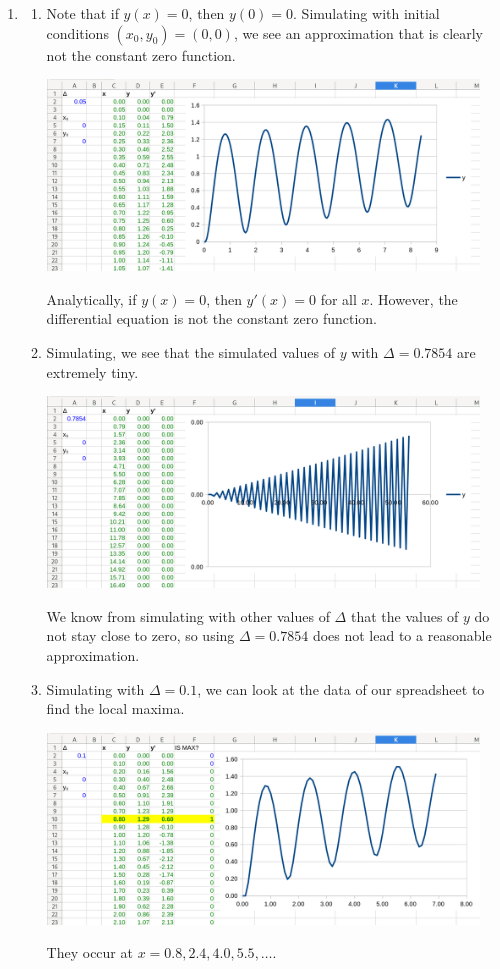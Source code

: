 		\begin{enumerate}
			\item \begin{enumerate}
					\item Note that if $y(x)=0$, then $y(0)=0$. Simulating with initial conditions $(x_0,y_0)=(0,0)$, we see
					an approximation that is clearly not the constant zero function.
					\begin{center}
						\includegraphics[height=2in]{resources/tutorial-01-sheet1.png}
					\end{center}
					
					Analytically, if $y(x)=0$, then $y'(x) = 0$ for all $x$. However, the differential equation is not the constant zero function.
					
					\item Simulating, we see that the simulated values of $y$ with $\Delta=0.7854$ are extremely tiny.
					\begin{center}
						\includegraphics[height=2in]{resources/tutorial-01-sheet1b.png}
					\end{center}
					We know from simulating with other values of $\Delta$ that the values of $y$ do not stay close to zero, so using $\Delta=0.7854$ does
					not lead to a reasonable approximation.
					
					\item Simulating with $\Delta=0.1$, we can look at the data of our spreadsheet to find the local maxima.
					\begin{center}
						\includegraphics[height=2in]{resources/tutorial-01-sheet1c.png}
					\end{center}
					They occur at $x=0.8, 2.4, 4.0, 5.5,\ldots$.


\end{enumerate}
\end{enumerate}
